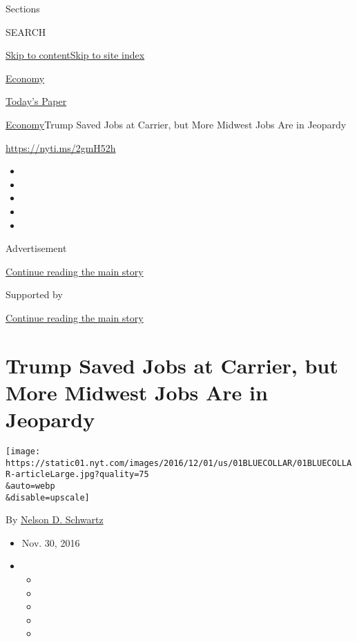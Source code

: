 Sections

SEARCH

\protect\hyperlink{site-content}{Skip to
content}\protect\hyperlink{site-index}{Skip to site index}

\href{https://www.nytimes.com/section/business/economy}{Economy}

\href{https://myaccount.nytimes.com/auth/login?response_type=cookie\&client_id=vi}{}

\href{https://www.nytimes.com/section/todayspaper}{Today's Paper}

\href{/section/business/economy}{Economy}\textbar{}Trump Saved Jobs at
Carrier, but More Midwest Jobs Are in Jeopardy

\url{https://nyti.ms/2gmH52h}

\begin{itemize}
\item
\item
\item
\item
\item
\end{itemize}

Advertisement

\protect\hyperlink{after-top}{Continue reading the main story}

Supported by

\protect\hyperlink{after-sponsor}{Continue reading the main story}

\hypertarget{trump-saved-jobs-at-carrier-but-more-midwest-jobs-are-in-jeopardy}{%
\section{Trump Saved Jobs at Carrier, but More Midwest Jobs Are in
Jeopardy}\label{trump-saved-jobs-at-carrier-but-more-midwest-jobs-are-in-jeopardy}}

\texttt{[image: https://static01.nyt.com/images/2016/12/01/us/01BLUECOLLAR/01BLUECOLLAR-articleLarge.jpg?quality=75\\\&auto=webp\\\&disable=upscale]}

By \href{http://www.nytimes.com/by/nelson-d-schwartz}{Nelson D.
Schwartz}

\begin{itemize}
\item
  Nov. 30, 2016
\item
  \begin{itemize}
  \item
  \item
  \item
  \item
  \item
  \end{itemize}
\end{itemize}


